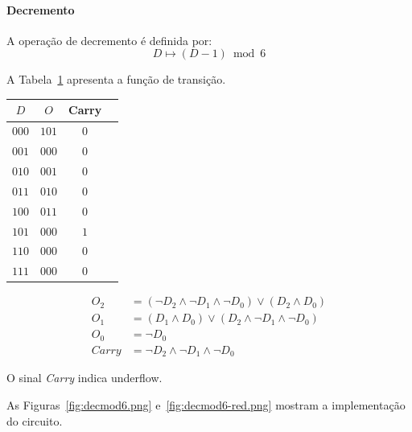 
\paragraph{Decremento}
A operação de decremento é definida por:
\[
D \mapsto (D - 1) \bmod 6
\]

A Tabela~\ref{tab:dec_mod6} apresenta a função de transição.

\begin{table} [H] \label{tab:dec_mod6}
\begin{center}
\begin{tabular}{c|ccc}    
    $D$ & $O$ & Carry \\
    \hline
    $000$ & $101$ & $0$ \\
    $001$ & $000$ & $0$ \\
    $010$ & $001$ & $0$ \\
    $011$ & $010$ & $0$ \\
    $100$ & $011$ & $0$ \\
    $101$ & $000$ & $1$ \\
    $110$ & $000$ & $0$ \\
    $111$ & $000$ & $0$ \\
\end{tabular}
\end{center}
\end{table}

\begin{align*}
    O_2 &= (\lnot D_2 \land \lnot D_1 \land \lnot D_0) \lor (D_2 \land D_0) \\[4pt]
    O_1 &= (D_1 \land D_0) \lor (D_2 \land \lnot D_1 \land \lnot D_0) \\[4pt]
    O_0 &= \lnot D_0 \\[4pt]
    Carry &= \lnot D_2 \land \lnot D_1 \land \lnot D_0
\end{align*}

O sinal \textit{Carry} indica underflow.

As Figuras~\ref{fig:decmod6.png} e~\ref{fig:decmod6-red.png} mostram a implementação do circuito.

